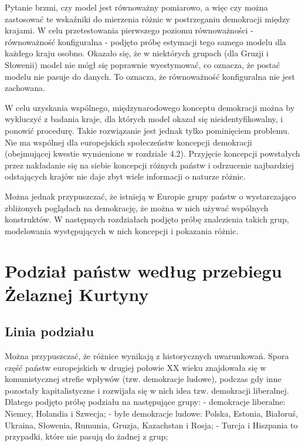 \documentclass[12pt]{article}
\begin{document}
Pytanie brzmi, czy model jest równoważny pomiarowo, a więc czy można zastosować te wskaźniki do mierzenia różnic w postrzeganiu demokracji między krajami. W celu przetestowania pierwszego poziomu równoważności - równoważność konfiguralna - podjęto próbę estymacji tego samego modelu dla każdego kraju osobno. Okazało się, że w niektórych grupach (dla Gruzji i Słowenii) model nie mógł się poprawnie wyestymować, co oznacza, że postać modelu nie pasuje do danych. To oznacza, że równoważność konfiguralna nie jest zachowana.

W celu uzyskania wspólnego, międzynarodowego konceptu demokracji można by wykluczyć z badania kraje, dla których model okazał się nieidentyfikowalny, i ponowić procedurę. Takie rozwiązanie jest jednak tylko pominięciem problemu. Nie ma wspólnej dla europejskich społeczeństw koncepcji demokracji (obejmującej kwestie wymienione w rozdziale 4.2). Przyjęcie koncepcji powstałych przez nakładanie się na siebie koncepcji różnych państw i odrzucenie najbardziej odstających krajów nie daje zbyt wiele informacji o naturze różnic.

Można jednak przypuszczać, że istnieją w Europie grupy państw o wystarczająco zbliżonych poglądach na demokrację, że można w nich używać wspólnych konstruktów. W następnych rozdziałach podjęto próbę znalezienia takich grup, modelowania występujących w nich koncepcji i pokazania różnic.

\hypertarget{podziaux142-paux144stw-wedux142ug-przebiegu-ux17celaznej-kurtyny}{%
\section{Podział państw według przebiegu Żelaznej Kurtyny}\label{podziaux142-paux144stw-wedux142ug-przebiegu-ux17celaznej-kurtyny}}

\hypertarget{linia-podziaux142u}{%
\subsection{Linia podziału}\label{linia-podziaux142u}}

Można przypuszczać, że różnice wynikają z historycznych uwarunkowań. Spora część państw europejskich w drugiej połowie XX wieku znajdowała się w komunistycznej strefie wpływów (tzw. demokracje ludowe), podczas gdy inne pozostały kapitalistyczne i rozwijała się w nich idea tzw. demokracji liberalnej. Dlatego podjęto próbę podziału na następujące grupy:
- demokracje liberalne: Niemcy, Holandia i Szwecja;
- byłe demokracje ludowe: Polska, Estonia, Białoruś, Ukraina, Słowenia, Rumunia, Gruzja, Kazachstan i Rosja;
- Turcja i Hiszpania to przypadki, które nie pasują do żadnej z grup;
\end{document}
